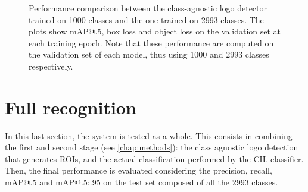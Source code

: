 \begin{figure}[H]
	\centering
    \qquad
    \caption{Performance comparison between the class-agnostic logo detector trained on 1000 classes and the one trained on 2993 classes. The plots show mAP@.5, box loss and object loss on the validation set at each training epoch. Note that these performance are computed on the validation set of each model, thus using 1000 and 2993 classes respectively.}
	\label{fig:exp-det_2993}
\end{figure}


\section{Full recognition}
\label{sec:exp-end2end}
In this last section, the system is tested as a whole.
This consists in combining the first and second stage (see \autoref{chap:methods}): the class agnostic logo detection that generates ROIs, and the actual classification performed by the CIL classifier.
Then, the final performance is evaluated considering the precision, recall, mAP@.5 and mAP@.5:.95 on the test set composed of all the 2993 classes.

